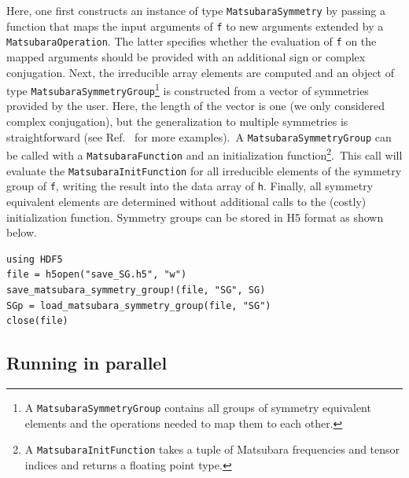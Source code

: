 \documentclass{SciPost}
\begin{document}
Here, one first constructs an instance of type \texttt{MatsubaraSymmetry} by passing a function that maps the input arguments of \texttt{f} to new arguments extended by a \texttt{MatsubaraOperation}. The latter specifies whether the evaluation of \texttt{f} on the mapped arguments should be provided with an additional sign or complex conjugation. Next, the irreducible array elements are computed and an object of type \texttt{MatsubaraSymmetryGroup}\footnote{ A \texttt{MatsubaraSymmetryGroup} contains all groups of symmetry equivalent elements and the operations needed to map them to each other.} is constructed from a vector of symmetries provided by the user. Here, the length of the vector is one (we only considered complex conjugation), but the generalization to multiple symmetries is straightforward (see Ref.~\cite{mbe_solver} for more examples).~A \texttt{MatsubaraSymmetryGroup} can be called with a \texttt{MatsubaraFunction} and an initialization function\footnote{ A \texttt{MatsubaraInitFunction} takes a tuple of Matsubara frequencies and tensor indices and returns a floating point type.}.~This call will evaluate the \texttt{MatsubaraInitFunction} for all irreducible elements of the symmetry group of \texttt{f}, writing the result into the data array of \texttt{h}. Finally, all symmetry equivalent elements are determined without additional calls to the (costly) initialization function. Symmetry groups can be stored in H5 format as shown below.
%
\begin{verbatim}
using HDF5
file = h5open("save_SG.h5", "w")
save_matsubara_symmetry_group!(file, "SG", SG)
SGp = load_matsubara_symmetry_group(file, "SG")
close(file)
\end{verbatim}
    
\subsection{Running in parallel}
\label{subsec:mpi}
\end{document}
